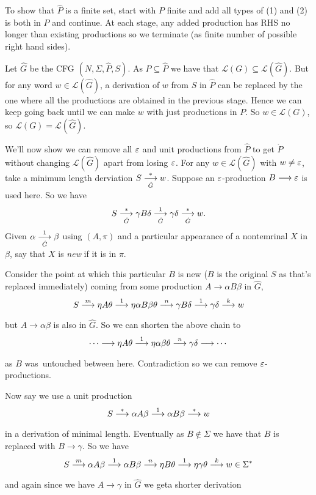 \documentclass[tikx, border = 10pt]{article}
\begin{document}
To show that $ \hat P $ is a finite set, start with $ P $ finite and add all types of (1) and (2) is both in $ P $ and continue. At each stage, any added production has RHS no longer than existing productions so we terminate (as finite number of possible right hand sides).\par
Let $ \hat G $ be the CFG $ (N,\Sigma, \hat P,S) $. As $ P\subseteq \hat P $ we have that $ \mathcal L(G)\subseteq \mathcal L(\hat G) $. But for any word $ w\in \mathcal L(\hat G) $, a derivation of $ w $ from $ S $ in $ \hat P $ can be replaced by the one where all the productions are obtained in the previous stage. Hence we can keep going back until we can make $ w $ with just productions in $ P $. So $ w\in \mathcal L(G) $, so $ \mathcal L(G)=\mathcal L(\hat G) $.\par
We'll now show we can remove all $ \ep $ and unit productions from $ \hat P $ to get $ \mathring P $ without changing $ \mathcal L(\hat G) $ apart from losing $ \ep $. For any $ w\in \mathcal L(\hat G) $ with $ w\ne \ep $, take a minimum length derviation $ S\arr{\hat G}{*} w $. Suppose an $ \ep $-production $ B\longrightarrow \ep $ is used here. So we have
\[
	S\arr{\hat G}{*} \gamma B \delta \arr{\hat G}{1} \gamma\delta \arr{\hat G}{*} w.
\]
Given $ \alpha \arr{\hat G}1 \beta $ using $ (A,\pi) $ and a particular appearance of a nontemrinal $ X $ in $ \beta $, say that $ X $ is \textit{new} if it is in $ \pi $.\par
Consider the point at which this particular $ B $ is new ($ B $ is the original $ S $ as that's replaced immediately) coming from some production $ A\longrightarrow \alpha B\beta $ in $ \hat G $,
\[
	S\arr{}{m}\eta A \theta \arr{}{1} \eta \alpha B\beta \theta \arr{}{n} \gamma B\delta \arr{}{1}\gamma\delta \arr{}{k} w
\]
but $ A\longrightarrow \alpha\beta $ is also in	$ \hat G $. So we can shorten the above chain to
\[
	\cdots \longrightarrow \eta A \theta \arr{}{1} \eta \alpha\beta\theta \arr{}{n} \gamma\delta\longrightarrow\cdots
\]
as $ B $ was\ untouched between here. Contradiction so we can remove $ \ep $-productions.\par
Now say we use a unit production
\[
	S\arr{}{*} \alpha A \beta \arr{}{1} \alpha B \beta \arr{}{*} w
\]
in a derivation of minimal length. Eventually as $ B\notin \Sigma $ we have that $ B $ is replaced with $ B\longrightarrow \gamma $. So we have 
\[
	S \arr{}m \alpha A \beta \arr{}{1} \alpha B\beta \arr{}{n} \eta B\theta \arr{}{1} \eta \gamma\theta\arr{}{k}w \in \Sigma^*
\]
and again since we have $ A\longrightarrow \gamma $ in $ \hat G $ we geta shorter derivation
\end{document}
